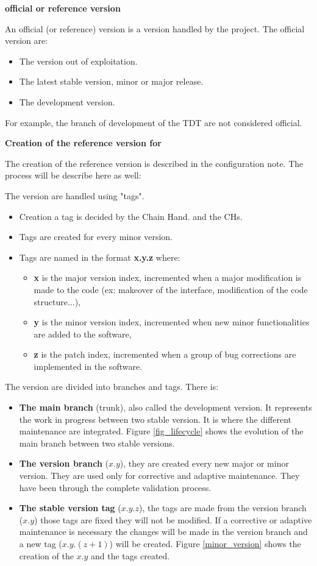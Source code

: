 \textbf{\telemacsystem official or reference version}

An official (or reference) version is a version handled by the \telemacsystem project.
The official version are:
\begin{itemize}
\item The version out of exploitation.
\item The latest stable version, minor or major release.
\item The development version.
\end{itemize}

For example, the branch of development of the TDT are not considered
official.

\textbf{Creation of the reference version for \telemacsystem}

The creation of the reference version is described in the configuration note.
The process will be describe here as well:

The \telemacsystem version are handled using "tags".
\begin{itemize}
\item Creation a tag is decided by the Chain Hand. and the CHs.
\item Tags are created for every minor version.
\item Tags are named in the format \textbf{x.y.z} where:
\begin{itemize}
\item \textbf{x} is the major version index, incremented when a major
modification is made to the code (ex: makeover of the interface, modification
of the code structure...),
\item \textbf{y} is the minor version index, incremented when new minor
functionalities are added to the software,
\item \textbf{z} is the patch index, incremented when a group of bug
corrections are implemented in the software.
\end{itemize}
\end{itemize}

The version are divided into branches and tags. There is:
\begin{itemize}
\item \textbf{The main branch} (trunk), also called the development version. It
represents the work in progress between two stable version. It is where the
different maintenance are integrated. Figure \ref{fig_lifecycle} shows the
evolution of the main branch between two stable versions.
\item \textbf{The version branch} ($x.y$), they are created every new major or
minor version. They are used only for corrective and adaptive maintenance. They
have been through the complete validation process.
\item \textbf{The stable version tag} ($x.y.z$), the tags are made from the version
branch ($x.y$) those tags are fixed they will not be modified. If a corrective
or adaptive maintenance is necessary the changes will be made in the version
branch and a new tag ($x.y.(z+1)$) will be created. Figure \ref{minor_version}
shows the creation of the $x.y$ and the tags created.
\end{itemize}

